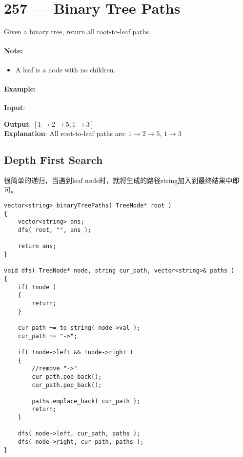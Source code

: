 \section{257 --- Binary Tree Paths}
Given a binary tree, return all root-to-leaf paths.
\par
\paragraph{Note:}
\begin{itemize}
\item  A leaf is a node with no children.
\end{itemize}

\paragraph{Example:}
\begin{flushleft}
\textbf{Input}:
\\
\begin{figure}[H]
\end{figure}
\textbf{Output}: $[1\longrightarrow 2 \longrightarrow 5, 1\longrightarrow 3]$
\\
\textbf{Explanation}: All root-to-leaf paths are: $1\longrightarrow 2\longrightarrow 5$, $1\longrightarrow 3$
\end{flushleft}
\subsection{Depth First Search}
很简单的递归，当遇到leaf node时，就将生成的路径string加入到最终结果中即可。
\setcounter{lstlisting}{0}
\begin{lstlisting}[style=customc, caption={Depth First Search}]
vector<string> binaryTreePaths( TreeNode* root )
{
    vector<string> ans;
    dfs( root, "", ans );

    return ans;
}

void dfs( TreeNode* node, string cur_path, vector<string>& paths )
{
    if( !node )
    {
        return;
    }

    cur_path += to_string( node->val );
    cur_path += "->";

    if( !node->left && !node->right )
    {
        //remove "->"
        cur_path.pop_back();
        cur_path.pop_back();

        paths.emplace_back( cur_path );
        return;
    }

    dfs( node->left, cur_path, paths );
    dfs( node->right, cur_path, paths );
}
\end{lstlisting}